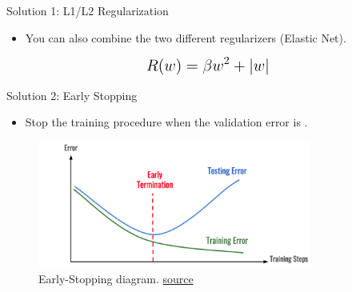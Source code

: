 \begin{frame}{Solution 1: L1/L2 Regularization}
    \begin{itemize}
        \item You can also combine the two different regularizers (Elastic Net).
    \end{itemize}
    \begin{equation*}
        \mathlarger{\mathlarger{
        R(w) = \beta w^2 + \vert w\vert
        }}
    \end{equation*}
\end{frame}

\begin{frame}{Solution 2: Early Stopping}
    \begin{itemize}
        \item Stop the training procedure when the validation error is .
    \end{itemize}
    \begin{figure}
	\centering
	\includegraphics[width=0.8\textwidth]{Figs/Early Stopping.png}
	\caption{Early-Stopping diagram. \href{https://medium.com/analytics-v7idhya/early-stopping-with-pytorch-to-restrain-your-model-from-overfitting-dce6de4081c5}{source}}
    \end{figure}
\end{frame}

